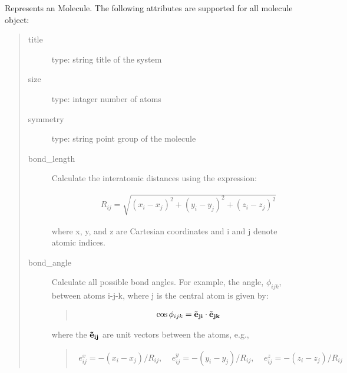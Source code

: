 \documentclass[letterpaper,10pt,english]{sphinxmanual}
\begin{document}
Represents an Molecule. The following attributes are supported for all molecule
object:
\begin{quote}
\begin{description}
\item[{title}] \leavevmode
type: string
title of the system

\item[{size}] \leavevmode
type: intager
number of atoms

\item[{symmetry}] \leavevmode
type: string
point group of the molecule

\item[{bond\_length}] \leavevmode\begin{description}
\item[{Calculate the interatomic distances using the expression:}] \leavevmode\begin{equation*}
\begin{split}R_{ij}=\sqrt{(x_i-x_j)^2 + (y_i - y_j)^2 + (z_i - z_j)^2}\end{split}
\end{equation*}
\end{description}

where x, y, and z are Cartesian coordinates and i and j denote atomic indices.

\item[{bond\_angle}] \leavevmode
Calculate all possible bond angles. For example, the angle, \(\phi_{ijk}\), between atoms i-j-k, where j is the central atom is given by:
\begin{quote}
\begin{equation*}
\begin{split}\cos {\phi_{ijk}} = {\bf \vec{e}_{ji} } \cdot {\bf \vec{e}_{jk}}\end{split}
\end{equation*}\end{quote}

where the \(\bf \vec{e}_{ij}\) are unit vectors between the atoms, e.g.,
\begin{quote}
\begin{equation*}
\begin{split}e_{ij}^x = - \left(x_i - x_j \right)/R_{ij},\ \ \ \ \
e_{ij}^y = - \left(y_i - y_j \right)/R_{ij},\ \ \ \ \
e_{ij}^z = - \left(z_i - z_j \right)/R_{ij}\end{split}
\end{equation*}\end{quote}


\end{description}
\end{quote}
\end{document}
